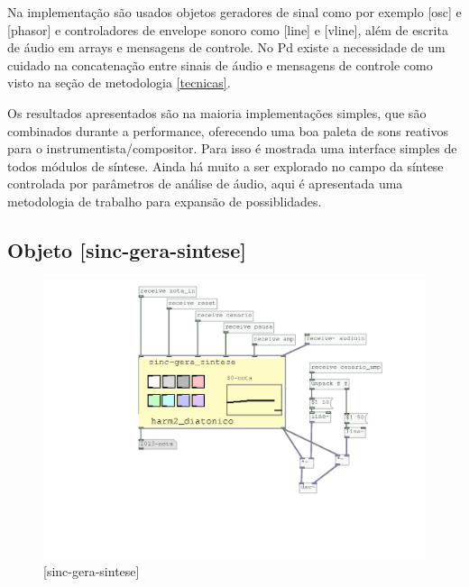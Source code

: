 \documentclass{ppgmus}
\begin{document}
Na implementação são usados objetos geradores de sinal como
por exemplo [osc\texttildelow] e [phasor\texttildelow] e
controladores de envelope sonoro como [line\texttildelow] e
[vline\texttildelow], além de escrita de áudio em arrays e 
mensagens de controle.
No Pd existe a necessidade de um cuidado na concatenação entre
sinais de áudio e mensagens de controle como visto na seção de metodologia \ref{tecnicas}.




Os resultados apresentados são na maioria implementações simples,
que são combinados durante a performance, oferecendo uma boa paleta
de sons reativos para o instrumentista/compositor. Para isso é
mostrada uma interface simples de todos módulos de síntese.
Ainda há muito a ser explorado no campo da síntese controlada
por parâmetros de análise de áudio, aqui é apresentada uma
metodologia de trabalho para expansão de possiblidades.











% 
% 



\subsection{ Objeto [sinc-gera-sintese]}


\begin{figure}
\includegraphics[scale=.6]{sinc-gera-sintese}
\caption{[sinc-gera-sintese]}
\label{sincgerasintese}
\end{figure}
\end{document}
